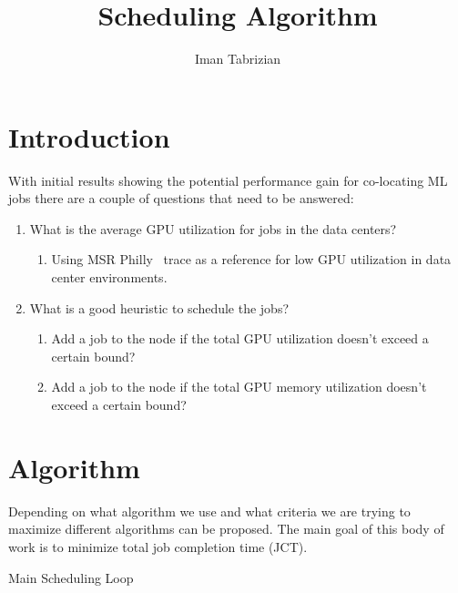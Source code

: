 \documentclass[11pt]{article}
\author{Iman Tabrizian}
\title{Scheduling Algorithm}
\begin{document}
\maketitle

\section{Introduction}
With initial results showing the potential performance gain for co-locating ML
jobs there are a couple of questions that need to be answered:

\begin{enumerate}
    \item What is the average GPU utilization for jobs in the data centers?
        \begin{enumerate}
            \item Using MSR Philly~\cite{philly} trace as a reference for low
                GPU utilization in data center environments.
        \end{enumerate}
    \item What is a good heuristic to schedule the jobs?
        \begin{enumerate}
            \item Add a job to the node if the total GPU utilization doesn't
                exceed a certain bound?
            \item Add a job to the node if the total GPU memory utilization
                doesn't exceed a certain bound?
        \end{enumerate}
\end{enumerate}

\section{Algorithm}

Depending on what algorithm we use and what criteria we are trying to maximize
different algorithms can be proposed. The main goal of this body of work is to
minimize total job completion time (JCT).

\begin{algorithm}[H]
    \SetAlgoLined
    \caption{Main Scheduling Loop}
\end{algorithm}
\end{document}
